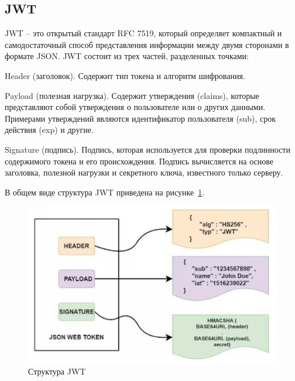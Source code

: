\subsection{JWT}\label{subsec:domain:jwt}
JWT -- это открытый стандарт RFC 7519, который определяет компактный и самодостаточный способ представления информации между двумя сторонами в формате JSON.
JWT состоит из трех частей, разделенных точками:
\begin{enumerate_num}
    \item Header (заголовок).
    Содержит тип токена и алгоритм шифрования.
    \item Payload (полезная нагрузка).
    Содержит утверждения (claims), которые представляют собой утверждения о пользователе или о других данными.
    Примерами утверждений являются идентификатор пользователя (sub), срок действия (exp) и другие.
    \item Signature (подпись).
    Подпись, которая используется для проверки подлинности содержимого токена и его происхождения.
    Подпись вычисляется на основе заголовка, полезной нагрузки и секретного ключа, известного только серверу.
\end{enumerate_num}

В общем виде структура JWT приведена на рисунке~\ref{fig:domain:jwt-structure}.

\begin{figure}[ht]
    \centering
    \includegraphics[width=.8\linewidth]{images/jwt_struct}
    \caption{Структура JWT}
    \label{fig:domain:jwt-structure}
\end{figure}



